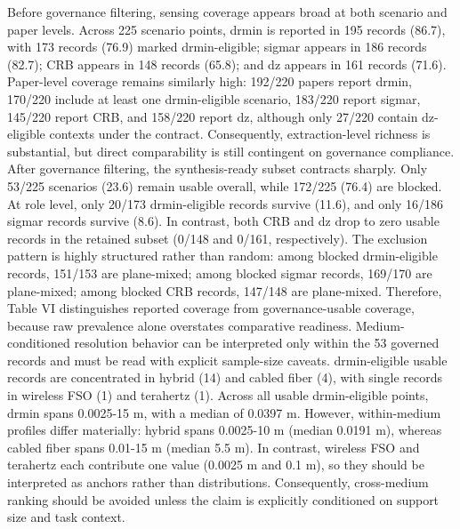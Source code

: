 {}Before governance filtering, sensing coverage appears broad at both scenario and paper levels. Across 225 scenario points, drmin is reported in 195 records (86.7\markdownRendererPercentSign{}), with 173 records (76.9\markdownRendererPercentSign{}) marked drmin-eligible; sigma\markdownRendererUnderscore{}r appears in 186 records (82.7\markdownRendererPercentSign{}); CRB appears in 148 records (65.8\markdownRendererPercentSign{}); and dz appears in 161 records (71.6\markdownRendererPercentSign{}). Paper-level coverage remains similarly high: 192/220 papers report drmin, 170/220 include at least one drmin-eligible scenario, 183/220 report sigma\markdownRendererUnderscore{}r, 145/220 report CRB, and 158/220 report dz, although only 27/220 contain dz-eligible contexts under the contract. Consequently, extraction-level richness is substantial, but direct comparability is still contingent on governance compliance.\markdownRendererParagraphSeparator
{}After governance filtering, the synthesis-ready subset contracts sharply. Only 53/225 scenarios (23.6\markdownRendererPercentSign{}) remain usable overall, while 172/225 (76.4\markdownRendererPercentSign{}) are blocked. At role level, only 20/173 drmin-eligible records survive (11.6\markdownRendererPercentSign{}), and only 16/186 sigma\markdownRendererUnderscore{}r records survive (8.6\markdownRendererPercentSign{}). In contrast, both CRB and dz drop to zero usable records in the retained subset (0/148 and 0/161, respectively). The exclusion pattern is highly structured rather than random: among blocked drmin-eligible records, 151/153 are plane-mixed; among blocked sigma\markdownRendererUnderscore{}r records, 169/170 are plane-mixed; among blocked CRB records, 147/148 are plane-mixed. Therefore, Table VI distinguishes reported coverage from governance-usable coverage, because raw prevalence alone overstates comparative readiness.\markdownRendererParagraphSeparator
{}Medium-conditioned resolution behavior can be interpreted only within the 53 governed records and must be read with explicit sample-size caveats. drmin-eligible usable records are concentrated in hybrid (14) and cabled fiber (4), with single records in wireless FSO (1) and terahertz (1). Across all usable drmin-eligible points, drmin spans 0.0025-15 m, with a median of 0.0397 m. However, within-medium profiles differ materially: hybrid spans 0.0025-10 m (median 0.0191 m), whereas cabled fiber spans 0.01-15 m (median 5.5 m). In contrast, wireless FSO and terahertz each contribute one value (0.0025 m and 0.1 m), so they should be interpreted as anchors rather than distributions. Consequently, cross-medium ranking should be avoided unless the claim is explicitly conditioned on support size and task context.\markdownRendererParagraphSeparator
